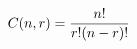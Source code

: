 \documentclass[preview]{standalone}
\begin{document}
\begin{align*}
\special{dvisvgm:raw <g id='unique000'>}C(n, r) = \frac{n!}{r!(n-r)!}\special{dvisvgm:raw </g>}
\end{align*}
\end{document}
